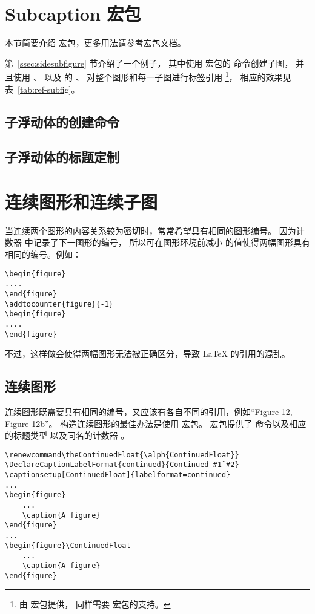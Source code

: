 \section{Subcaption 宏包}\label{sec:subcaption-pkg}

本节简要介绍  宏包，更多用法请参考宏包文档\cite{subcaption-doc}。

第~\ref{ssec:sidesubfigure} 节介绍了一个例子，
其中使用  宏包的  命令创建子图，
并且使用 、 以及  的 、 对整个图形和每一子图进行标签引用
\footnote{
	 由  宏包提供， 同样需要  宏包的支持。}，
相应的效果见表~\ref{tab:ref-subfig}。

\subsection{子浮动体的创建命令}

\subsection{子浮动体的标题定制}

\section{连续图形和连续子图}\label{sec:contfig}

当连续两个图形的内容关系较为密切时，常常希望具有相同的图形编号。
因为计数器  中记录了下一图形的编号，
所以可在图形环境前减小  的值使得两幅图形具有相同的编号。例如：
\begin{lstlisting}
\begin{figure}
....
\end{figure}
\addtocounter{figure}{-1}
\begin{figure}
....
\end{figure}
\end{lstlisting}
不过，这样做会使得两幅图形无法被正确区分，导致 \LaTeX{} 的引用的混乱。

\subsection{连续图形}

连续图形既需要具有相同的编号，又应该有各自不同的引用，例如“Figure 12, Figure 12b”。
构造连续图形的最佳办法是使用  宏包。
 宏包提供了  命令以及相应的标题类型  以及同名的计数器 。
\begin{lstlisting}
\renewcommand\theContinuedFloat{\alph{ContinuedFloat}}
\DeclareCaptionLabelFormat{continued}{Continued #1˜#2}
\captionsetup[ContinuedFloat]{labelformat=continued}
...
\begin{figure}
	...
	\caption{A figure}
\end{figure}
...
\begin{figure}\ContinuedFloat
	...
	\caption{A figure}
\end{figure}
\end{lstlisting}

